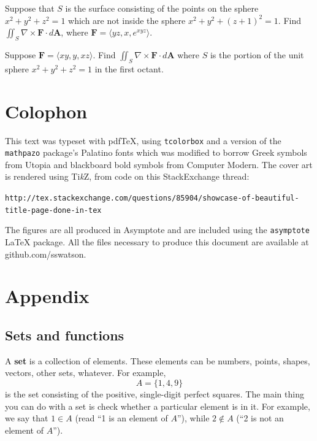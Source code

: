 \documentclass[svgnames]{watsonbook}
\begin{document}
\begin{exercise}{}{}
  Suppose that $S$ is the surface consisting of the points on the
  sphere $x^2 + y^2 + z^2 = 1$ which are not inside the sphere
  $x^2 + y^2 + (z+1)^2 = 1$. Find $\iint_{S} \nabla \times \mathbf{F}
  \cdot d\mathbf{A}$, where $\mathbf{F} = \langle yz, x, e^{xyz}
  \rangle$. 
\end{exercise}

\begin{exercise}{}{}
  Suppose $\mathbf{F} = \langle xy, y, xz \rangle$. Find
  $\iint_S \nabla \times \mathbf{F} \cdot d\mathbf{A}$ where $S$ is the portion
  of the unit sphere $x^2 + y^2 + z^2 = 1$ in the first octant.
\end{exercise}

\chapter*{Colophon}

This text was typeset with pdf\TeX, using \texttt{tcolorbox} and a version of the
\texttt{mathpazo} package's Palatino fonts which was modified to borrow
Greek symbols from Utopia and blackboard bold symbols from Computer
Modern. The cover art is rendered using Ti\textit{k}Z, from code on
this StackExchange thread:

\texttt{http://tex.stackexchange.com/questions/85904/showcase-of-beautiful-title-page-done-in-tex}

The figures are all produced in Asymptote and are included using the
\texttt{asymptote} LaTeX package. All the files necessary to produce
this document are available at github.com/sswatson.

\appendix

\chapter{Appendix} 

\section{Sets and functions} 

A \textbf{set} is a collection of elements. These elements can be numbers, points, shapes, vectors, other sets, whatever. For example, 
\[
  A = \{1,4,9\} 
\]
is the set consisting of the positive, single-digit perfect squares. The main thing you can do with a set is check whether a particular element is in it. For example, we say that $1 \in A$ (read ``1 is an element of $A$''), while $2 \notin A$ (``2 is not an element of $A$''). 
\end{document}
